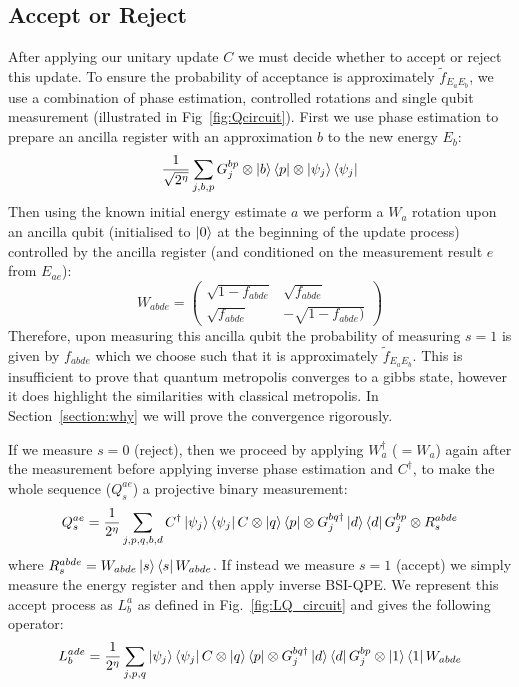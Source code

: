 \documentclass[aps,floatfix,10pt,amssymb,amsfont,amsmath,superscriptaddress,float,nofootinbib,longbibliography,nobalancelastpage,twocolumn]{revtex4-2}
\begin{document}
\subsection{Accept or Reject}
\label{section:acceptprob}
After applying our unitary update $C$ we must decide whether to accept or reject this update. To ensure the probability of acceptance is approximately $\tilde{f}_{E_aE_b}$, we use a combination of phase estimation, controlled rotations and single qubit measurement (illustrated in Fig~\ref{fig:Qcircuit}). First we use phase estimation to prepare an ancilla register with an approximation $b$ to the new energy $E_b$:
\begin{equation}
   \frac{1}{\sqrt{2^{\eta}}}\sum_{j,b,p}G_j^{bp}\otimes\ket{b}\bra{p}\otimes\ket{\psi_j}\bra{\psi_j}
\end{equation}
Then using the known initial energy estimate $a$ we perform a $W_{a}$ rotation upon an ancilla qubit (initialised to $\ket{0}$ at the beginning of the update process) controlled by the ancilla register (and conditioned on the measurement result $e$ from $E_{ae}$):
\begin{equation}
    W_{abde} = \begin{pmatrix}
        \sqrt{1 - f_{abde}} & \sqrt{f_{abde}}\\
       \sqrt{f_{abde}} & -\sqrt{1 - f_{abde})}
    \end{pmatrix}
\end{equation}
Therefore, upon measuring this ancilla qubit the probability of measuring $s=1$ is given by $f_{abde}$ which we choose such that it is approximately $\tilde f_{E_aE_b}$. This is insufficient to prove that quantum metropolis converges to a gibbs state, however it does highlight the similarities with classical metropolis. In Section~\ref{section:why} we will prove the convergence rigorously.

If we measure $s=0$ (reject), then we proceed by applying $W_{a}^{\dagger}$ ($=W_a$) again after the measurement before applying inverse phase estimation and $C^{\dagger}$, to make the whole sequence ($Q_s^{ae}$) a projective binary measurement:
\begin{equation} 
    Q_s^{ae} = \frac{1}{2^{\eta}}\sum_{j,p,q,b,d}  C^{\dagger}\ket{\psi_j}\bra{\psi_j}C \otimes \ket{q}\bra{p} \otimes G_j^{bq\dagger}\ket{d}\bra{d}G_j^{bp}\otimes R^{abde}_s
\end{equation}
where $R^{abde}_s = W_{abde}\ket{s}\bra{s}W_{abde}$. If instead we measure $s=1$ (accept) we simply measure the energy register and then apply inverse BSI-QPE. We represent this accept process as $L^a_b$ as defined in Fig.~\ref{fig:LQ_circuit} and gives the following operator:
\begin{equation}
    L^{ade}_b = \frac{1}{2^{\eta}}\sum_{j,p,q}\ket{\psi_j}\bra{\psi_j}C \otimes \ket{q}\bra{p} \otimes G^{bq\dagger}_j \ket{d}\bra{d}G^{bp}_j \otimes \ket{1}\bra{1}W_{abde}
\end{equation}
\end{document}
